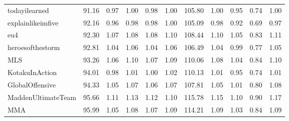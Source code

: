 \begin{tabular}{lrrrrrrrrrr}
todayilearned       &          91.16 &                0.97 &                1.00 &                0.98 &                1.00 &                105.80 &                       1.00 &                       0.95 &                       0.74 &                       1.00 \\
explainlikeimfive   &          92.16 &                0.96 &                0.98 &                0.98 &                1.00 &                105.09 &                       0.98 &                       0.92 &                       0.69 &                       0.97 \\
eu4                 &          92.30 &                1.07 &                1.08 &                1.08 &                1.10 &                108.44 &                       1.10 &                       1.05 &                       0.83 &                       1.11 \\
heroesofthestorm    &          92.81 &                1.04 &                1.06 &                1.04 &                1.06 &                106.49 &                       1.04 &                       0.99 &                       0.77 &                       1.05 \\
MLS                 &          93.26 &                1.06 &                1.10 &                1.07 &                1.09 &                110.06 &                       1.08 &                       1.04 &                       0.84 &                       1.10 \\
KotakuInAction      &          94.01 &                0.98 &                1.01 &                1.00 &                1.02 &                110.13 &                       1.01 &                       0.95 &                       0.74 &                       1.01 \\
GlobalOffensive     &          94.33 &                1.05 &                1.07 &                1.06 &                1.07 &                107.81 &                       1.05 &                       1.01 &                       0.80 &                       1.08 \\
MaddenUltimateTeam  &          95.66 &                1.11 &                1.13 &                1.12 &                1.10 &                115.78 &                       1.15 &                       1.10 &                       0.90 &                       1.17 \\
MMA                 &          95.99 &                1.05 &                1.08 &                1.07 &                1.09 &                114.21 &                       1.09 &                       1.03 &                       0.84 &                       1.09 \\

\end{tabular}
